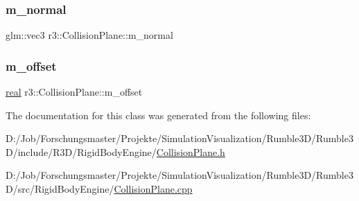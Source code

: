 \mbox{\label{classr3_1_1_collision_plane_ab65e832434d2da433e79c93ac12f4b43}} 
\subsubsection{\texorpdfstring{m\+\_\+normal}{m\_normal}}
{\footnotesize\ttfamily glm\+::vec3 r3\+::\+Collision\+Plane\+::m\+\_\+normal\hspace{0.3cm}{\ttfamily [protected]}}

\mbox{\label{classr3_1_1_collision_plane_a8ae3c28197b05088e405ff9944632f74}} 
\subsubsection{\texorpdfstring{m\+\_\+offset}{m\_offset}}
{\footnotesize\ttfamily \mbox{\hyperlink{namespacer3_ab2016b3e3f743fb735afce242f0dc1eb}{real}} r3\+::\+Collision\+Plane\+::m\+\_\+offset\hspace{0.3cm}{\ttfamily [protected]}}



The documentation for this class was generated from the following files\+:\begin{DoxyCompactItemize}
\item 
D\+:/\+Job/\+Forschungsmaster/\+Projekte/\+Simulation\+Visualization/\+Rumble3\+D/\+Rumble3\+D/include/\+R3\+D/\+Rigid\+Body\+Engine/\mbox{\hyperlink{_collision_plane_8h}{Collision\+Plane.\+h}}\item 
D\+:/\+Job/\+Forschungsmaster/\+Projekte/\+Simulation\+Visualization/\+Rumble3\+D/\+Rumble3\+D/src/\+Rigid\+Body\+Engine/\mbox{\hyperlink{_collision_plane_8cpp}{Collision\+Plane.\+cpp}}\end{DoxyCompactItemize}

